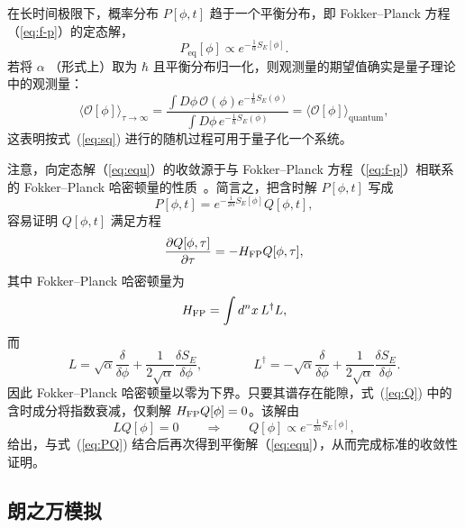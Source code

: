 在长时间极限下，概率分布 $P[\phi,t]$ {趋于}一个平衡分布，即 Fokker--Planck 方程（\ref{eq:f-p}）的定态解，
\begin{equation}
P_{\text{eq}}[\phi] \propto e^{-\frac{1}{\alpha}S_E[\phi]}.
\label{eq:equ}
\end{equation}
若将 $\alpha$ （形式上）取为 $\hbar$ 且平衡分布归一化，则观测量的期望值确实是量子理论中的观测量：
\begin{equation}
\langle \mathcal{O}[\phi] \rangle_{\tau\to\infty} = \frac{\int D\phi \, \mathcal{O}(\phi) e^{-\frac{1}{\hbar}S_E(\phi)}}{\int D\phi \, e^{-\frac{1}{\hbar}S_E(\phi)}}
= \langle \mathcal{O}[\phi] \rangle_{\text{quantum}},
\end{equation}
这表明按式~(\ref{eq:sq}) 进行的随机过程可用于量子化一个系统。

{
注意，向定态解（\ref{eq:equ}）的收敛源于与 Fokker--Planck 方程（\ref{eq:f-p}）相联系的 Fokker--Planck 哈密顿量的性质~\cite{Damgaard:1987rr}。简言之，把含时解 $P[\phi,t]$ 写成
\begin{equation}
\label{eq:PQ}
P[\phi,t]=e^{-\frac{1}{2\alpha}S_E[\phi]} Q[\phi,t],
\end{equation}
容易证明 $Q[\phi,t]$ 满足方程
\begin{equation}
\label{eq:Q}
\frac{\partial Q[\phi, \tau]}{\partial \tau}  = -H_{\rm FP}Q[\phi, \tau],
\end{equation}
其中 Fokker--Planck 哈密顿量为
\begin{equation}
H_{\rm FP} = \int d^nx\, L^\dagger L,
\end{equation}
而
\begin{equation}
L = \sqrt{\alpha}\frac{\delta}{\delta \phi} + \frac{1}{2\sqrt{\alpha}}\frac{\delta S_E}{\delta\phi},
\qquad\qquad
L^\dagger = -\sqrt{\alpha}\frac{\delta}{\delta \phi} + \frac{1}{2\sqrt{\alpha}}\frac{\delta S_E}{\delta
\phi}.
\end{equation}
因此 Fokker--Planck 哈密顿量以零为下界。只要其谱存在能隙，式~(\ref{eq:Q}) 中的含时成分将指数衰减，仅剩解 $H_{\rm FP}Q[\phi]=0$。该解由
\begin{equation}
LQ[\phi]=0 \qquad \Rightarrow \qquad Q[\phi] \propto
e^{-\frac{1}{2\alpha}S_E[\phi]},
\end{equation}
给出，与式~(\ref{eq:PQ}) 结合后再次得到平衡解（\ref{eq:equ}），从而完成标准的收敛性证明。
}

\subsection{朗之万模拟}
\label{subsec:sim}

